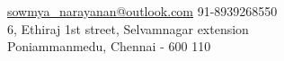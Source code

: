 
\nobreakvspace{0.3em}  %


\noindent\href{mailto:sowmya_narayanan@outlook.com}{sowmya\_narayanan\mbox{}@\mbox{}outlook.com}\sbull
\textsmaller{+}91-8939268550
\\
6, Ethiraj 1st street, Selvamnagar extension
\\
Poniammanmedu, Chennai - 600 110
